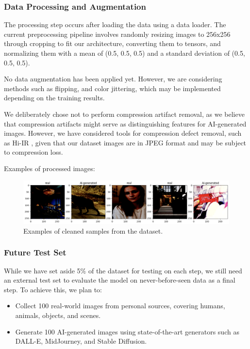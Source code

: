 \documentclass{article} %
\begin{document}
\subsubsection{Data Processing and Augmentation}
The processing step occurs after loading the data using a data loader. The current preprocessing pipeline involves randomly resizing images to 256x256 through cropping to fit our architecture, converting them to tensors, and normalizing them with a mean of (0.5, 0.5, 0.5) and a standard deviation of (0.5, 0.5, 0.5). 

No data augmentation has been applied yet. However, we are considering methods such as flipping, and color jittering, which may be implemented depending on the training results.

We deliberately chose not to perform compression artifact removal, as we believe that compression artifacts might serve as distinguishing features for AI-generated images. However, we have considered tools for compression defect removal, such as Hi-IR \citep{li2024hierarchicalinformationflowgeneralized}, given that our dataset images are in JPEG format and may be subject to compression loss.

Examples of processed images:
\begin{figure}[h]
    \centering
    \includegraphics[width=1\textwidth]{figs/data_examples.png}
    \caption{Examples of cleaned samples from the dataset.}
    \label{fig:cleaned_sample}
\end{figure}

\subsubsection{Future Test Set}
While we have set aside 5\% of the dataset for testing on each step, we still need an external test set to evaluate the model on never-before-seen data as a final step. To achieve this, we plan to:

\begin{itemize}
    \item Collect 100 real-world images from personal sources, covering humans, animals, objects, and scenes.
    \item Generate 100 AI-generated images using state-of-the-art generators such as DALL-E, MidJourney, and Stable Diffusion.
\end{itemize}
\end{document}
